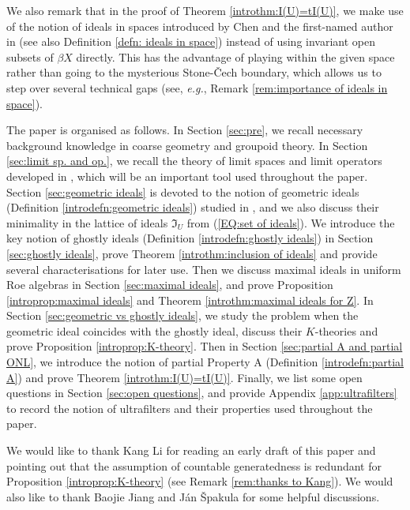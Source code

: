 \documentclass[12pt, a4paper]{amsart}
\numberwithin{equation}{section}
\theoremstyle{definition}
\theoremstyle{remark}
\begin{document}
We also remark that in the proof of Theorem \ref{introthm:I(U)=tI(U)}, we make use of the notion of ideals in spaces introduced by Chen and the first-named author in \cite{CW04} (see also Definition \ref{defn: ideals in space}) instead of using invariant open subsets of $\beta X$ directly. This has the advantage of playing within the given space rather than going to the mysterious Stone-\v{C}ech boundary, which allows us to step over several technical gaps (see, \emph{e.g.}, Remark \ref{rem:importance of ideals in space}).


The paper is organised as follows. In Section \ref{sec:pre}, we recall necessary background knowledge in coarse geometry and groupoid theory. In Section \ref{sec:limit sp. and op.}, we recall the theory of limit spaces and limit operators developed in \cite{SW17}, which will be an important tool used throughout the paper. Section \ref{sec:geometric ideals} is devoted to the notion of geometric ideals (Definition \ref{introdefn:geometric ideals}) studied in \cite{CW04, Wan07}, and we also discuss their minimality in the lattice of ideals $\mathfrak{I}_U$ from (\ref{EQ:set of ideals}). We introduce the key notion of ghostly ideals (Definition \ref{introdefn:ghostly ideals}) in Section \ref{sec:ghostly ideals}, prove Theorem \ref{introthm:inclusion of ideals} and provide several characterisations for later use. Then we discuss maximal ideals in uniform Roe algebras in Section \ref{sec:maximal ideals}, and prove Proposition \ref{introprop:maximal ideals} and Theorem \ref{introthm:maximal ideals for Z}. In Section \ref{sec:geometric vs ghostly ideals}, we study the problem when the geometric ideal coincides with the ghostly ideal, discuss their $K$-theories and prove Proposition \ref{introprop:K-theory}. Then in Section \ref{sec:partial A and partial ONL}, we introduce the notion of partial Property A (Definition \ref{introdefn:partial A}) and prove Theorem \ref{introthm:I(U)=tI(U)}. Finally, we list some open questions in Section \ref{sec:open questions}, and provide Appendix \ref{app:ultrafilters} to record the notion of ultrafilters and their properties used throughout the paper.


 We would like to thank Kang Li for reading an early draft of this paper and pointing out that the assumption of countable generatedness is redundant for Proposition \ref{introprop:K-theory} (see Remark \ref{rem:thanks to Kang}). We would also like to thank Baojie Jiang and J\'{a}n \v{S}pakula for some helpful discussions.
\end{document}
